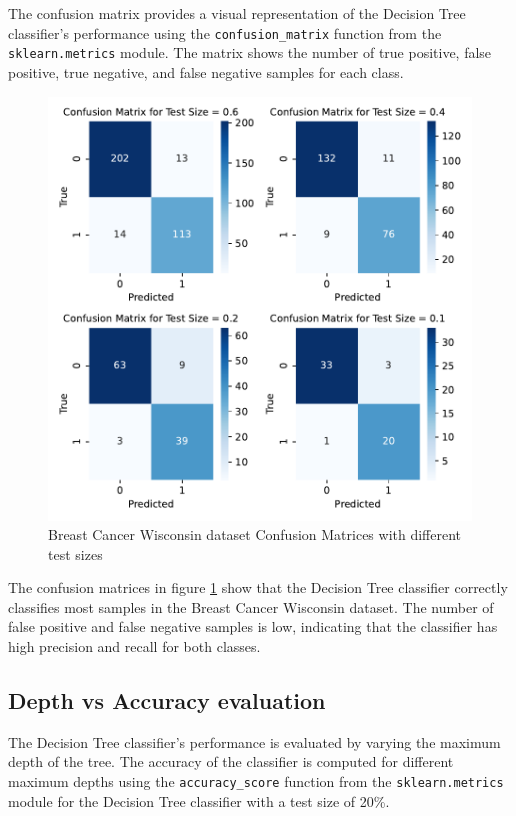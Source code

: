 The confusion matrix provides a visual representation of the Decision Tree classifier's performance using the \texttt{confusion\_matrix} function from the \texttt{sklearn.metrics} module. The matrix shows the number of true positive, false positive, true negative, and false negative samples for each class.

\begin{figure}[H]
    \centering
    \includegraphics[width=.7\textwidth]{figures/breast_cancer_wisconsin_confusion_matrices.pdf}
    \caption{Breast Cancer Wisconsin dataset Confusion Matrices with different test sizes}
    \label{fig:breast_cancer_wisconsin_confusion_matrices}
\end{figure}

The confusion matrices in figure \ref{fig:breast_cancer_wisconsin_confusion_matrices} show that the Decision Tree classifier correctly classifies most samples in the Breast Cancer Wisconsin dataset. The number of false positive and false negative samples is low, indicating that the classifier has high precision and recall for both classes.

\subsection{Depth vs Accuracy evaluation}

The Decision Tree classifier's performance is evaluated by varying the maximum depth of the tree. The accuracy of the classifier is computed for different maximum depths using the \texttt{accuracy\_score} function from the \texttt{sklearn.metrics} module for the Decision Tree classifier with a test size of 20\%.

